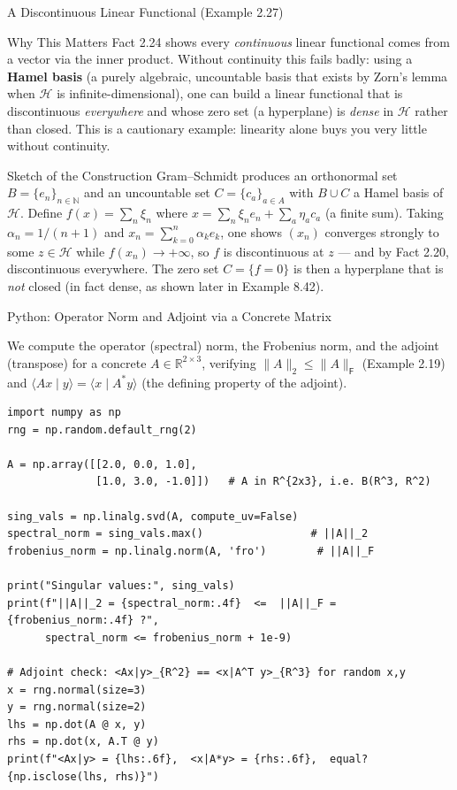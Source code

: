 \documentclass[aspectratio=169,10pt]{beamer}
\newcommand{\R}{\mathbb{R}}
\newcommand{\N}{\mathbb{N}}
\newcommand{\Hil}{\mathcal{H}}
\newcommand{\ip}[2]{\langle #1 \mid #2 \rangle}
\begin{document}
\begin{frame}[allowframebreaks]{A Discontinuous Linear Functional (Example 2.27)}
  \begin{block}{Why This Matters}
    Fact 2.24 shows every \emph{continuous} linear functional comes from a
    vector via the inner product. Without continuity this fails badly:
    using a \textbf{Hamel basis} (a purely algebraic, uncountable basis
    that exists by Zorn's lemma when $\Hil$ is infinite-dimensional), one
    can build a linear functional that is discontinuous \emph{everywhere}
    and whose zero set (a hyperplane) is \emph{dense} in $\Hil$ rather than
    closed. This is a cautionary example: linearity alone buys you very
    little without continuity.
  \end{block}

  \begin{block}{Sketch of the Construction}
    Gram--Schmidt produces an orthonormal set $B=\{e_n\}_{n\in\N}$ and an
    uncountable set $C=\{c_a\}_{a\in A}$ with $B\cup C$ a Hamel basis of
    $\Hil$. Define $f(x) = \sum_n \xi_n$ where $x = \sum_n \xi_n e_n +
    \sum_a \eta_a c_a$ (a finite sum). Taking $\alpha_n=1/(n+1)$ and
    $x_n=\sum_{k=0}^n \alpha_k e_k$, one shows $(x_n)$ converges strongly to
    some $z\in\Hil$ while $f(x_n)\to+\infty$, so $f$ is discontinuous at
    $z$ --- and by Fact 2.20, discontinuous everywhere. The zero set $C =
    \{f=0\}$ is then a hyperplane that is \emph{not} closed (in fact dense,
    as shown later in Example 8.42).
  \end{block}
\end{frame}

\begin{frame}[fragile]{Python: Operator Norm and Adjoint via a Concrete Matrix}

We compute the operator (spectral) norm, the Frobenius norm, and the
adjoint (transpose) for a concrete $A \in \R^{2\times 3}$, verifying
$\|A\|_2 \le \|A\|_{\mathsf F}$ (Example 2.19) and $\ip{Ax}{y}=\ip{x}{A^*y}$
(the defining property of the adjoint).

\begin{lstlisting}[style=pycode]
import numpy as np
rng = np.random.default_rng(2)

A = np.array([[2.0, 0.0, 1.0],
              [1.0, 3.0, -1.0]])   # A in R^{2x3}, i.e. B(R^3, R^2)

sing_vals = np.linalg.svd(A, compute_uv=False)
spectral_norm = sing_vals.max()                 # ||A||_2
frobenius_norm = np.linalg.norm(A, 'fro')        # ||A||_F

print("Singular values:", sing_vals)
print(f"||A||_2 = {spectral_norm:.4f}  <=  ||A||_F = {frobenius_norm:.4f} ?",
      spectral_norm <= frobenius_norm + 1e-9)

# Adjoint check: <Ax|y>_{R^2} == <x|A^T y>_{R^3} for random x,y
x = rng.normal(size=3)
y = rng.normal(size=2)
lhs = np.dot(A @ x, y)
rhs = np.dot(x, A.T @ y)
print(f"<Ax|y> = {lhs:.6f},  <x|A*y> = {rhs:.6f},  equal? {np.isclose(lhs, rhs)}")
\end{lstlisting}
\end{frame}
\end{document}
